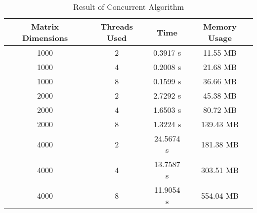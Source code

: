 \documentclass[a4paper,10pt]{article}
\begin{document}
\begin{table}[h]
    \centering
    \begin{tabular}{|c|c|c|c|}
    \hline
       \textbf{Matrix Dimensions}&  \textbf{Threads Used} & \textbf{Time}& \textbf{Memory Usage} \\\hline

          1000&    2&   0.3917 s&  11.55 MB\\\hline
          1000&    4&   0.2008 s&  21.68 MB\\\hline
          1000&    8&   0.1599 s& 36.66 MB \\\hline

          2000&    2&   2.7292 s&  45.38 MB\\\hline
          2000&    4&   1.6503 s&  80.72 MB\\\hline
          2000&    8&   1.3224 s& 139.43 MB \\\hline

          4000&    2&   24.5674 s&  181.38 MB\\\hline
          4000&    4&   13.7587 s&  303.51 MB\\\hline
          4000&    8&   11.9054 s&  554.04 MB \\\hline
    \end{tabular}
    \caption{Result of Concurrent Algorithm}
\end{table}

\clearpage
\end{document}
